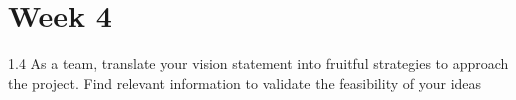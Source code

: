 \documentclass[final]{scrreprt} %
\begin{document}
\chapter{Week 4}
1.4 As a team, translate your vision statement into fruitful strategies to approach 
the project. Find relevant information to validate the feasibility of your ideas
\end{document}
